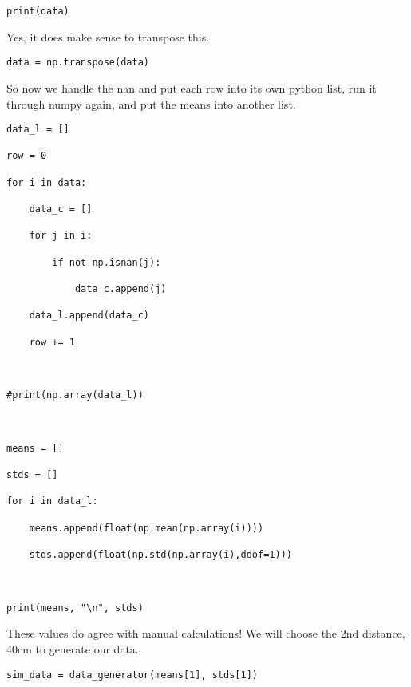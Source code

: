 \documentclass[12pt]{article}
\begin{document}
\medskip
\bigskip
 
\begin{lstlisting}[frame=shadowbox]
print(data)
\end{lstlisting}
\medskip

Yes, it does make sense to transpose this.

\bigskip
 
\begin{lstlisting}[frame=shadowbox]
data = np.transpose(data)
\end{lstlisting}
\medskip

So now we handle the nan and put each row into its own python list, run it through numpy again, and put the means into another list.

\bigskip
 
\begin{lstlisting}[frame=shadowbox]
data_l = []

row = 0

for i in data:

    data_c = []

    for j in i:

        if not np.isnan(j):

            data_c.append(j)

    data_l.append(data_c)

    row += 1



#print(np.array(data_l))



means = []

stds = []

for i in data_l:

    means.append(float(np.mean(np.array(i))))

    stds.append(float(np.std(np.array(i),ddof=1)))



print(means, "\n", stds)
\end{lstlisting}
\medskip

These values do agree with manual calculations! We will choose the 2nd distance, 40cm to generate our data.

\bigskip
 
\begin{lstlisting}[frame=shadowbox]
sim_data = data_generator(means[1], stds[1])
\end{lstlisting}
\medskip
\end{document}
